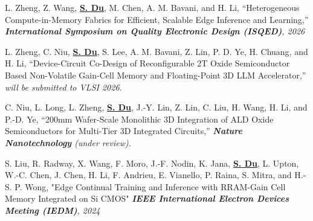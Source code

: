 \documentclass[10.5pt,letterpaper]{article}
\begin{document}
\begin{enumerate}[leftmargin=2em, noitemsep, label={[\arabic*]}]
       \item L. Zheng, Z. Wang, \textbf{\underline{S. Du}},  M. Chen,  A. M. Bavani, and H. Li, “Heterogeneous Compute-in-Memory Fabrics for Efficient, Scalable Edge Inference and Learning,” \textit{\textbf{International Symposium on Quality Electronic Design (ISQED)}, 2026}
       
       \item L. Zheng, C. Niu, \textbf{\underline{S. Du}}, S. Lee, A. M. Bavani, Z. Lin, P. D. Ye, H. Chuang, and H. Li, “Device-Circuit Co-Design of Reconfigurable 2T Oxide Semiconductor Based Non-Volatile Gain-Cell Memory and Floating-Point 3D LLM Accelerator,” \textit{will be submitted to VLSI 2026.}
       
       \item C. Niu, L. Long, L. Zheng, \textbf{\underline{S. Du}}, J.-Y. Lin, Z. Lin, C. Liu, H. Wang, H. Li, and P.-D. Ye, “200mm Wafer-Scale Monolithic 3D Integration of ALD Oxide Semiconductors for Multi-Tier 3D Integrated Circuits,” \textit{\textbf{Nature Nanotechnology} (under review).}
       

       \item S. Liu, R. Radway, X. Wang, F. Moro, J.-F. Nodin, K. Jana, \textbf{\underline{S. Du}}, L. Upton, W.-C. Chen, J. Chen, H. Li, F. Andrieu, E. Vianello, P. Raina, S. Mitra, and H.-S. P. Wong, "Edge Continual Training and Inference with RRAM-Gain Cell Memory Integrated on Si CMOS" \textit{\textbf{IEEE International Electron Devices Meeting (IEDM)}, 2024}
       


\end{enumerate}
\end{document}
